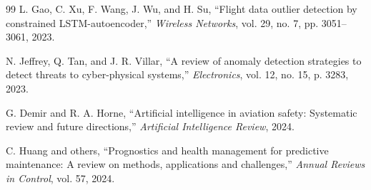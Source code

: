 \documentclass[12pt,a4paper]{report}
\begin{document}
\begin{thebibliography}{99}
		L. Gao, C. Xu, F. Wang, J. Wu, and H. Su,
		``Flight data outlier detection by constrained LSTM-autoencoder,''
		\emph{Wireless Networks}, vol. 29, no. 7, pp. 3051--3061, 2023.
		
		N. Jeffrey, Q. Tan, and J. R. Villar,
		``A review of anomaly detection strategies to detect threats to cyber-physical systems,''
		\emph{Electronics}, vol. 12, no. 15, p. 3283, 2023.
		
		G. Demir and R. A. Horne,
		``Artificial intelligence in aviation safety: Systematic review and future directions,''
		\emph{Artificial Intelligence Review}, 2024.
		
		C. Huang and others,
		``Prognostics and health management for predictive maintenance: A review on methods, applications and challenges,''
		\emph{Annual Reviews in Control}, vol. 57, 2024.
		
	\end{thebibliography}
	
\end{document}
